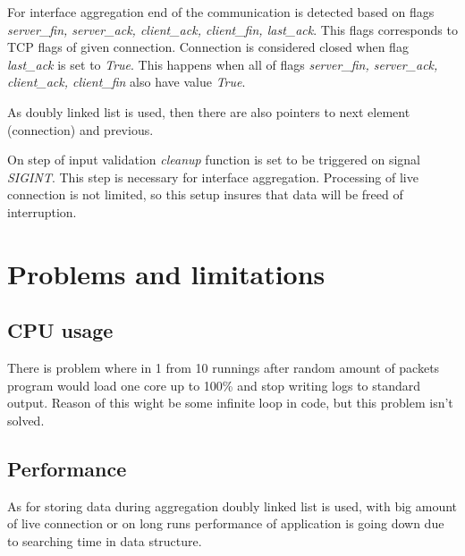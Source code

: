 \documentclass[12pt,a4paper]{article}
\begin{document}
    For interface aggregation end of the communication is detected based on flags 
    \textit{server\_fin, server\_ack, client\_ack, client\_fin, last\_ack}. This flags corresponds 
    to TCP flags of given connection. Connection is considered closed when flag \textit{last\_ack} 
    is set to \textit{True}. This happens when all of flags \textit{server\_fin, server\_ack, 
    client\_ack, client\_fin} also have value \textit{True}. 

    As doubly linked list is used, then there are also pointers to next element (connection) and 
    previous. 

    On step of input validation \textit{cleanup} function is set to be triggered on signal 
    \textit{SIGINT}. This step is necessary for interface aggregation. Processing of live connection 
    is not limited, so this setup insures that data will be freed of interruption.

    \section{Problems and limitations}
    \subsection{CPU usage}
    There is problem where in 1 from 10 runnings after random amount of packets program would 
    load one core up to 100\% and stop writing logs to standard output. Reason of this wight be 
    some infinite loop in code, but this problem isn't solved.  

    \subsection{Performance}
    As for storing data during aggregation doubly linked list is used, with big amount of 
    live connection or on long runs performance of application is going down due to searching
    time in data structure.

    \newpage
    \nocite{*}
    
    
\end{document}
